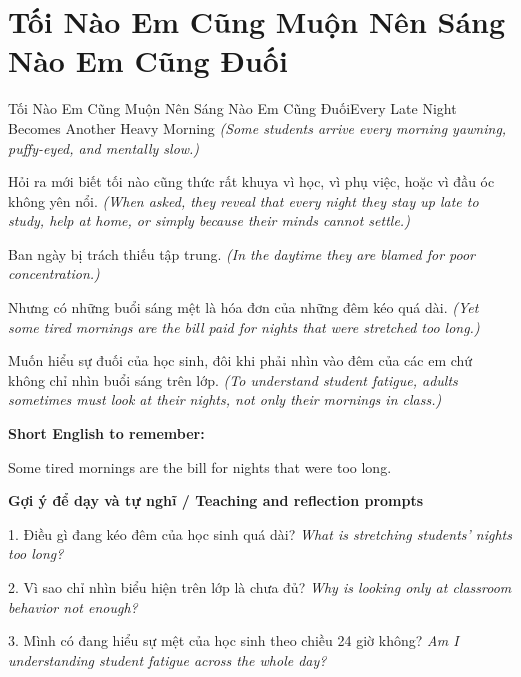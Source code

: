 \section{Tối Nào Em Cũng Muộn Nên Sáng Nào Em Cũng Đuối}
\begin{truyen}{Tối Nào Em Cũng Muộn Nên Sáng Nào Em Cũng Đuối}{Every Late Night Becomes Another Heavy Morning}
\textit{(Some students arrive every morning yawning, puffy-eyed, and mentally slow.)}

Hỏi ra mới biết tối nào cũng thức rất khuya vì học, vì phụ việc, hoặc vì đầu óc không yên nổi.
\textit{(When asked, they reveal that every night they stay up late to study, help at home, or simply because their minds cannot settle.)}

Ban ngày bị trách thiếu tập trung.
\textit{(In the daytime they are blamed for poor concentration.)}

Nhưng có những buổi sáng mệt là hóa đơn của những đêm kéo quá dài.
\textit{(Yet some tired mornings are the bill paid for nights that were stretched too long.)}

\end{truyen}

\begin{baihoc}
Muốn hiểu sự đuối của học sinh, đôi khi phải nhìn vào đêm của các em chứ không chỉ nhìn buổi sáng trên lớp.
\textit{(To understand student fatigue, adults sometimes must look at their nights, not only their mornings in class.)}
\end{baihoc}

\begin{ghinhoanh}
\textbf{Short English to remember:}

Some tired mornings are the bill for nights that were too long.

\end{ghinhoanh}

\begin{tuhocnhanh}
\textbf{Gợi ý để dạy và tự nghĩ / Teaching and reflection prompts}

1. Điều gì đang kéo đêm của học sinh quá dài? \textit{What is stretching students' nights too long?}

2. Vì sao chỉ nhìn biểu hiện trên lớp là chưa đủ? \textit{Why is looking only at classroom behavior not enough?}

3. Mình có đang hiểu sự mệt của học sinh theo chiều 24 giờ không? \textit{Am I understanding student fatigue across the whole day?}
\end{tuhocnhanh}
\ngancach

